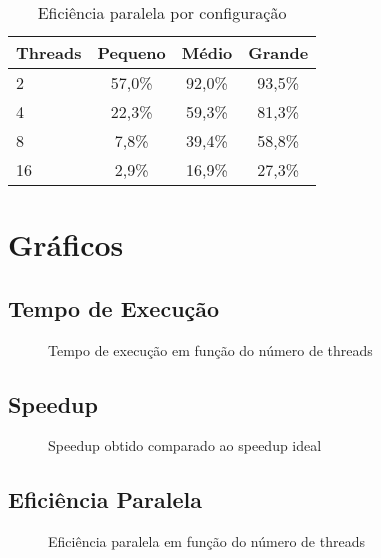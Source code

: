 \documentclass[12pt,a4paper]{article}
\begin{document}
\begin{table}[H]
\centering
\begin{tabular}{lccc}
\toprule
\textbf{Threads} & \textbf{Pequeno} & \textbf{Médio} & \textbf{Grande} \\
\midrule
2 & 57,0\% & 92,0\% & 93,5\% \\
4 & 22,3\% & 59,3\% & 81,3\% \\
8 & 7,8\% & 39,4\% & 58,8\% \\
16 & 2,9\% & 16,9\% & 27,3\% \\
\bottomrule
\end{tabular}
\caption{Eficiência paralela por configuração}
\end{table}

\section{Gráficos}

\subsection{Tempo de Execução}

\begin{figure}[H]
\centering
{}
\caption{Tempo de execução em função do número de threads}
\end{figure}

\subsection{Speedup}

\begin{figure}[H]
\centering
{}
\caption{Speedup obtido comparado ao speedup ideal}
\end{figure}

\subsection{Eficiência Paralela}

\begin{figure}[H]
\centering
{}
\caption{Eficiência paralela em função do número de threads}
\end{figure}
\end{document}
